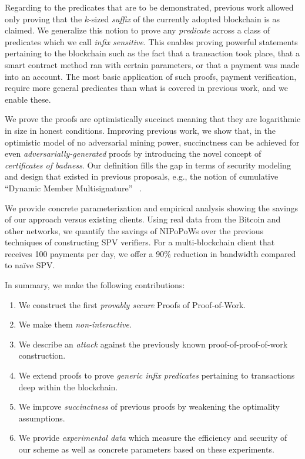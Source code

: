 Regarding to the predicates that are to be demonstrated, previous work allowed
only proving that the $k$-sized \emph{suffix} of the currently adopted
blockchain is as claimed. We generalize this notion to prove any
\emph{predicate} across a class of predicates which we call \emph{infix
sensitive}. This enables proving powerful statements pertaining to the
blockchain such as the fact that a transaction took place, that a smart contract
method ran with certain parameters, or that a payment was made into an account.
The most basic application of such proofs, payment verification, require more
general predicates than what is covered in previous work, and we enable these.

We prove the proofs are optimistically succinct meaning that they are
logarithmic in size in honest conditions. Improving previous work, we show that,
in the optimistic model of no adversarial mining power, succinctness can be
achieved for even \textit{adversarially-generated} proofs by introducing the
novel concept of \textit{certificates of badness}. Our definition fills the gap
in terms of security modeling and design that existed in previous proposals,
e.g., the notion of cumulative ``Dynamic Member Multisignature''
~\cite{sidechains}.

We provide concrete parameterization and empirical analysis showing the savings
of our approach versus existing clients. Using real data from the Bitcoin and
other networks, we quantify the savings of NIPoPoWs over the previous techniques
of constructing SPV verifiers. For a multi-blockchain client that receives 100
payments per day, we offer a 90\% reduction in bandwidth compared to na\"ive
SPV.


In summary, we make the following contributions:
\begin{enumerate}
  \item We construct the first \emph{provably secure} Proofs of Proof-of-Work.
  \item We make them \emph{non-interactive}.
  \item We describe an \emph{attack} against the previously known proof-of-proof-of-work construction.
  \item We extend proofs to prove \emph{generic infix predicates} pertaining to
        transactions deep within the blockchain.
  \item We improve \emph{succinctness} of previous proofs by weakening the
        optimality assumptions.
  \item We provide \emph{experimental data} which measure the efficiency and
        security of our scheme as well as concrete parameters based on these
        experiments.
\end{enumerate}
